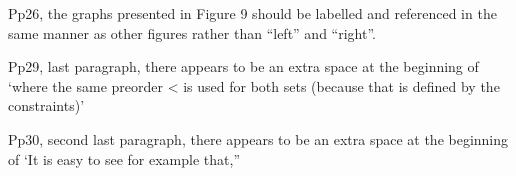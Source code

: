 \documentclass{article}
\begin{document}
Pp26, the graphs presented in Figure 9 should be labelled and referenced in the same manner as other figures rather than “left” and “right”.

Pp29, last paragraph, there appears to be an extra space at the beginning of ‘where the same preorder < is used for both sets (because that is defined by the constraints)’

Pp30, second last paragraph, there appears to be an extra space at the beginning of ‘It is easy to see for example that,”






\end{document}
